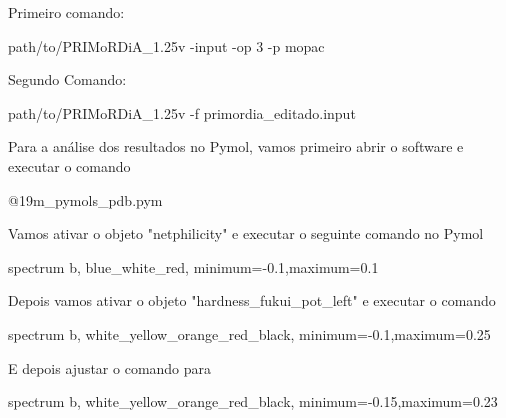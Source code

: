 \documentclass[a4paper,11pt]{refart}
\begin{document}
	Primeiro comando:
	
	\hspace*{-\leftmarginwidth}
	\begin{minipage}{\fullwidth}
		\begin{commandshell}path/to/PRIMoRDiA_1.25v -input -op 3 -p mopac\end{commandshell}
	\end{minipage}

	Segundo Comando:
	
	\hspace*{-\leftmarginwidth}
	\begin{minipage}{\fullwidth}
		\begin{commandshell}path/to/PRIMoRDiA_1.25v -f primordia\_editado.input\end{commandshell}
	\end{minipage}

	Para a análise dos resultados no Pymol, vamos primeiro abrir o software e executar o comando 
	
	\hspace*{-\leftmarginwidth}
	\begin{minipage}{\fullwidth}
		\begin{pymol}@19m_pymols_pdb.pym\end{pymol}
	\end{minipage}
	
	Vamos ativar o objeto "netphilicity" e executar o seguinte comando no Pymol 
	
	 \hspace*{-\leftmarginwidth}
	 \begin{minipage}{\fullwidth}
	 	\begin{pymol}spectrum b, blue_white_red, minimum=-0.1,maximum=0.1\end{pymol}
	 \end{minipage}
	
	Depois vamos ativar o objeto "hardness\_fukui\_pot\_left" e executar o comando


	\hspace*{-\leftmarginwidth}
	\begin{minipage}{\fullwidth}
		\begin{pymol}spectrum b, white_yellow_orange_red_black, minimum=-0.1,maximum=0.25\end{pymol}
	\end{minipage}
	
	E depois ajustar o comando para
	
	\hspace*{-\leftmarginwidth}
	\begin{minipage}{\fullwidth}
		\begin{pymol}spectrum b, white_yellow_orange_red_black, minimum=-0.15,maximum=0.23\end{pymol}
	\end{minipage}
\end{document}
